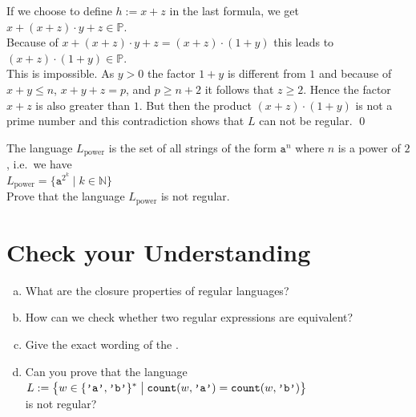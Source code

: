 If we choose to define $h := x + z$ in the last formula, we get
\\[0.2cm]
\hspace*{1.3cm}
$x + (x + z)\cdot y + z \in \mathbb{P}$.
\\[0.2cm]
Because of $x + (x + z)\cdot y + z = (x + z) \cdot (1 + y)$ this leads to
\\[0.2cm]
\hspace*{1.3cm}
$(x + z) \cdot (1 + y) \in \mathbb{P}$.
\\[0.2cm]
This is impossible. As $y > 0$ the factor $1 + y$ is different from $1$
and because of $x + y \leq n$, $x + y + z = p$, and $p \geq n + 2$ it follows that
$z \geq 2$.  Hence the factor $x + z$ is also greater than $1$.  But then the product
$(x + z) \cdot (1 + y)$ is not a prime number and this contradiction shows that $L$ can not be regular.
\qed


\exerciseEng
The language $L_{\mathrm{power}}$ is the set of all strings of the form $\mathtt{a}^n$ where $n$ is a power of
$2$, i.e.~we have
\\[0.2cm]
\hspace*{1.3cm}
$L_{\mathrm{power}} = \bigl\{ \mathtt{a}^{2^k} \mid k \in \mathbb{N} \bigr\}$
\\[0.2cm]
Prove that the language $L_{\mathrm{power}}$ is not regular.
\eox

\section{Check your Understanding}
\begin{enumerate}[(a)]
\item What are the closure properties of regular languages?
\item How can we check whether two regular expressions are equivalent?
\item Give the exact wording of the .
\item Can you prove that the language
      \\[0.2cm]
      \hspace*{1.3cm}
      $\displaystyle L := \bigl\{ w \in \{\texttt{'a'}, \texttt{'b'}\}^* \bigm| \texttt{count}(w, \texttt{'a'})=\texttt{count}(w, \texttt{'b'}) \bigr\}$
      \\[0.2cm]
      is not regular?
\end{enumerate}

